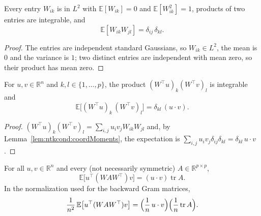 \begin{lemma}\label{lem:ntkcond:coordMoments}
  \leanok
Every entry $W_{ik}$ is in $L^2$ with $\mathbb E[W_{ik}]=0$ and $\mathbb E[W_{ik}^2]=1$, products of two entries are integrable, and
\[
  \mathbb E[W_{ik}W_{jl}]=\delta_{ij}\,\delta_{kl}.
\]
\end{lemma}

\begin{proof}
  \leanok
The entries are independent standard Gaussians, so $W_{ik}\in L^2$, the mean is $0$ and the variance is $1$; two distinct entries are independent with mean zero, so their product has mean zero.
\end{proof}

\begin{lemma}\label{lem:ntkcond:transposeMoments}
  \leanok
For $u,v\in\mathbb R^n$ and $k,l\in\{1,\dots,p\}$, the product $(W^\top u)_k(W^\top v)_l$ is integrable and
\[
  \mathbb E\bigl[(W^\top u)_k\,(W^\top v)_l\bigr]=\delta_{kl}\,(u\cdot v).
\]
\end{lemma}

\begin{proof}
  \leanok
$(W^\top u)_k(W^\top v)_l=\sum_{i,j}u_iv_jW_{ik}W_{jl}$ and, by Lemma~\ref{lem:ntkcond:coordMoments}, the expectation is $\sum_{i,j}u_iv_j\delta_{ij}\delta_{kl}=\delta_{kl}\,u\cdot v$.
\end{proof}

\begin{theorem}\label{thm:ntkcond:quadMean}
  \leanok
For all $u,v\in\mathbb R^n$ and every (not necessarily symmetric) $A\in\mathbb R^{p\times p}$,
\[
  \mathbb E\bigl[u^\top(WAW^\top)v\bigr]=(u\cdot v)\operatorname{tr}A.
\]
In the normalization used for the backward Gram matrices,
\[
  \frac1{n^2}\,\mathbb E\bigl[u^\top(WAW^\top)v\bigr]=\Bigl(\frac1n\,u\cdot v\Bigr)\Bigl(\frac1n\operatorname{tr}A\Bigr).
\]
\end{theorem}

